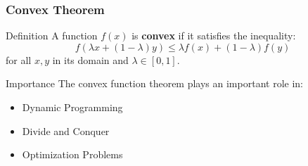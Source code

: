     

    
    
    




\begin{frame}
\frametitle{Convex Theorem}
\begin{block}{Definition}
    A function \( f(x) \) is \textbf{convex} if it satisfies the inequality:
    \[ f(\lambda x + (1 - \lambda)y) \leq \lambda f(x) + (1 - \lambda) f(y) \]
    for all \( x, y \) in its domain and \( \lambda \in [0,1] \).
\end{block}

\vspace{0.5cm}
\begin{block}{Importance}
    The convex function theorem plays an important role in:
    \begin{itemize}
        \item Dynamic Programming
        \item Divide and Conquer
        \item Optimization Problems
    \end{itemize}
\end{block}
\end{frame}

